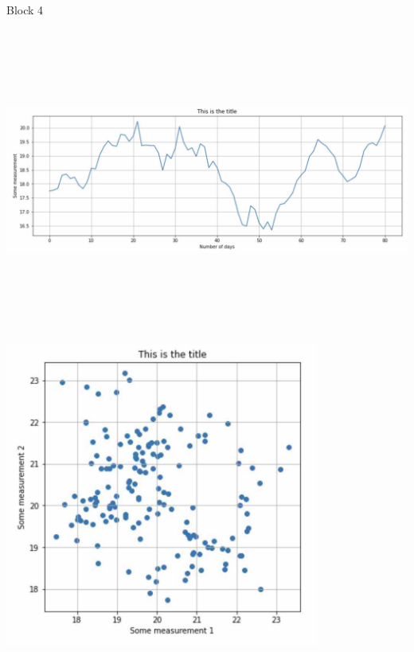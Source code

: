 \documentclass[
25pt,  %
a0paper, %
landscape, %
margin=0.1cm, %
innermargin=2cm, %
colspace=2cm, %
subcolspace=2cm, %
blockverticalspace=1.5cm %
]{tikzposter}
\begin{document}
\begin{columns}
\begin{block}{Block 4}
{\begin{center}
\begin{multicols}{2}
\begin{minipage}{0.45\columnwidth}
\includegraphics[height=10cm]{fig1}
\end{minipage}

\begin{minipage}{0.45\columnwidth}
\includegraphics[height=10cm]{fig2}
\end{minipage}

\end{multicols}
\end{center}


}\end{block}

\end{columns}
\end{document}
